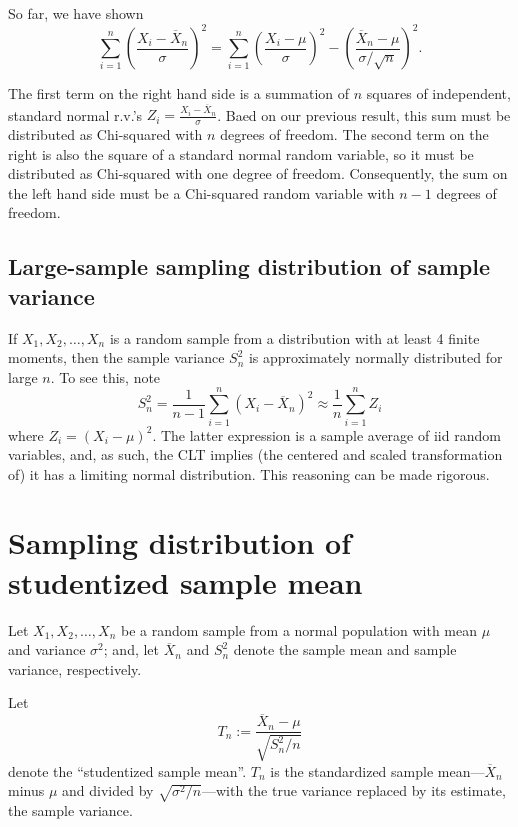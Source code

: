 \documentclass[
]{book}
\begin{document}
So far, we have shown
\[\sum_{i=1}^n \left(\frac{X_i - \overline X_n}{\sigma}\right)^2 = \sum_{i=1}^n \left(\frac{X_i - \mu}{\sigma}\right)^2 - \left(\frac{\overline X_n - \mu}{\sigma/\sqrt{n}}\right)^2.\]

The first term on the right hand side is a summation of \(n\) squares of independent, standard normal r.v.'s \(Z_i = \frac{X_i - \overline X_n}{\sigma}\). Baed on our previous result, this sum must be distributed as Chi-squared with \(n\) degrees of freedom. The second term on the right is also the square of a standard normal random variable, so it must be distributed as Chi-squared with one degree of freedom. Consequently, the sum on the left hand side must be a Chi-squared random variable with \(n-1\) degrees of freedom.

\hypertarget{large-sample-sampling-distribution-of-sample-variance}{%
\subsection{Large-sample sampling distribution of sample variance}\label{large-sample-sampling-distribution-of-sample-variance}}

If \(X_1, X_2, \ldots, X_n\) is a random sample from a distribution with at least 4 finite moments, then the sample variance \(S_n^2\) is approximately normally distributed for large \(n\). To see this, note
\[S_n^2 = \frac{1}{n-1}\sum_{i=1}^n (X_i - \overline X_n)^2 \approx \frac{1}{n}\sum_{i=1}^n Z_i\]
where \(Z_i = (X_i - \mu)^2\). The latter expression is a sample average of iid random variables, and, as such, the CLT implies (the centered and scaled transformation of) it has a limiting normal distribution. This reasoning can be made rigorous.

\hypertarget{sampling-distribution-of-studentized-sample-mean}{%
\section{Sampling distribution of studentized sample mean}\label{sampling-distribution-of-studentized-sample-mean}}

Let \(X_1, X_2, \ldots, X_n\) be a random sample from a normal population with mean \(\mu\) and variance \(\sigma^2\); and, let \(\overline X_n\) and \(S_n^2\) denote the sample mean and sample variance, respectively.

Let
\[T_n:=\frac{\overline X_n - \mu}{\sqrt{S_n^2 / n}}\]
denote the ``studentized sample mean''. \(T_n\) is the standardized sample mean---\(\overline X_n\) minus \(\mu\) and divided by \(\sqrt{\sigma^2/n}\)---with the true variance replaced by its estimate, the sample variance.
\end{document}
